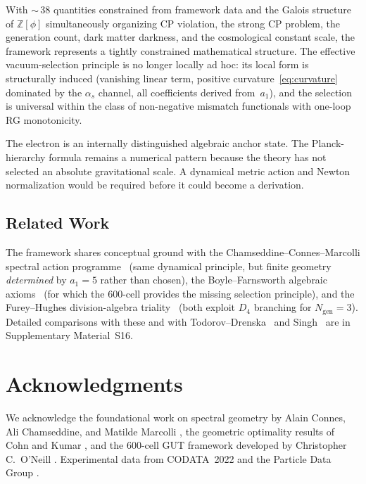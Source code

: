 \documentclass[12pt,a4paper]{article}
\theoremstyle{definition}
\begin{document}
With ${\sim}\,38$ quantities constrained from framework data and the Galois structure of $\mathbb{Z}[\phi]$ simultaneously organizing CP violation, the strong CP problem, the generation count, dark matter darkness, and the cosmological constant scale, the framework represents a tightly constrained mathematical structure.  The effective vacuum-selection principle is no longer locally ad hoc: its local form is structurally induced (vanishing linear term, positive curvature~\eqref{eq:curvature} dominated by the $\alpha_s$ channel, all coefficients derived from~$a_1$), and the selection is universal within the class of non-negative mismatch functionals with one-loop RG monotonicity.

The electron is an internally distinguished algebraic anchor state.  The
Planck-hierarchy formula remains a numerical pattern because the theory has
not selected an absolute gravitational scale.  A dynamical metric action and
Newton normalization would be required before it could become a derivation.

\subsection{Related Work}

The framework shares conceptual ground with the Chamseddine--Connes--Marcolli spectral action programme~\cite{chamseddine1997,ccm2007} (same dynamical principle, but finite geometry \emph{determined} by $a_1 = 5$ rather than chosen), the Boyle--Farnsworth algebraic axioms~\cite{boyle2020} (for which the 600-cell provides the missing selection principle), and the Furey--Hughes division-algebra triality~\cite{furey2024} (both exploit $D_4$ branching for $N_{\text{gen}} = 3$).  Detailed comparisons with these and with Todorov--Drenska~\cite{todorov2020} and Singh~\cite{singh2025} are in Supplementary Material~S16.

\section*{Acknowledgments}

We acknowledge the foundational work on spectral geometry by Alain Connes, Ali Chamseddine, and Matilde Marcolli \cite{chamseddine1997,ccm2007}, the geometric optimality results of Cohn and Kumar \cite{cohn2007,cohn2011}, and the 600-cell GUT framework developed by Christopher C.\ O'Neill \cite{oneill2025gut,oneill2023binary}. Experimental data from CODATA~2022 \cite{codata2022} and the Particle Data Group \cite{pdg2024}.
\end{document}
